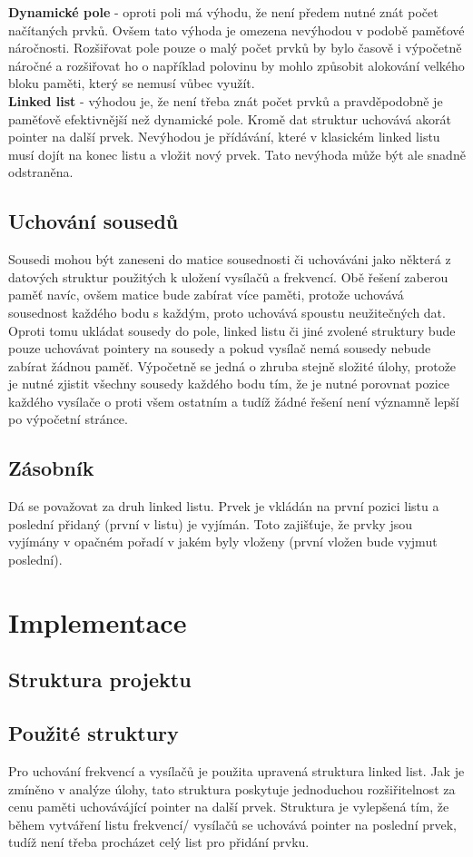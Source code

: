 \documentclass[12pt]{article}
\begin{document}
\textbf{Dynamické pole} - oproti poli má výhodu, že není předem nutné znát 
počet načítaných prvků. Ovšem tato výhoda je omezena nevýhodou v podobě 
paměťové náročnosti. Rozšiřovat pole pouze o malý počet prvků by bylo 
časově i výpočetně náročné a rozšiřovat ho o například polovinu by mohlo 
způsobit alokování velkého bloku paměti, který se nemusí vůbec využít.\\

\textbf{Linked list} - výhodou je, že není třeba znát počet prvků a 
pravděpodobně je paměťově efektivnější než dynamické pole. Kromě dat struktur 
uchovává akorát pointer na další prvek. Nevýhodou je přídávání, které v 
klasickém linked listu musí dojít na konec listu a vložit nový prvek. Tato 
nevýhoda může být ale snadně odstraněna.
\subsection{Uchování sousedů}
Sousedi mohou být zaneseni do matice sousednosti či uchováváni jako některá z 
datových struktur použitých k uložení vysílačů a frekvencí. Obě řešení 
zaberou paměť navíc, ovšem matice bude zabírat více paměti, protože uchovává 
sousednost každého bodu s každým, proto uchovává spoustu neužitečných dat. 
Oproti tomu ukládat sousedy do pole, linked listu či jiné zvolené struktury 
bude pouze uchovávat pointery na sousedy a pokud vysílač nemá sousedy nebude 
zabírat žádnou paměť. Výpočetně se jedná o zhruba stejně složité úlohy, protože
je nutné zjistit všechny sousedy každého bodu tím, že je nutné porovnat pozice
každého vysílače o proti všem ostatním a tudíž žádné řešení není významně lepší
po výpočetní stránce.
\subsection{Zásobník}
Dá se považovat za druh linked listu. Prvek je vkládán na první pozici listu a 
poslední přidaný (první v listu) je vyjímán. Toto zajišťuje, že prvky jsou 
vyjímány v opačném pořadí v jakém byly vloženy (první vložen bude vyjmut 
poslední).
%
%
\section{Implementace}
\subsection{Struktura projektu}
\subsection{Použité struktury}
Pro uchování frekvencí a vysílačů je použita upravená struktura linked list.
Jak je zmíněno v analýze úlohy, tato struktura poskytuje jednoduchou
rozšiřitelnost za cenu paměti uchovávájící pointer na další prvek. Struktura
je vylepšená tím, že během vytváření listu frekvencí/ vysílačů se uchovává 
pointer na poslední prvek, tudíž není třeba procházet celý list pro přidání
prvku.\\
\end{document}
